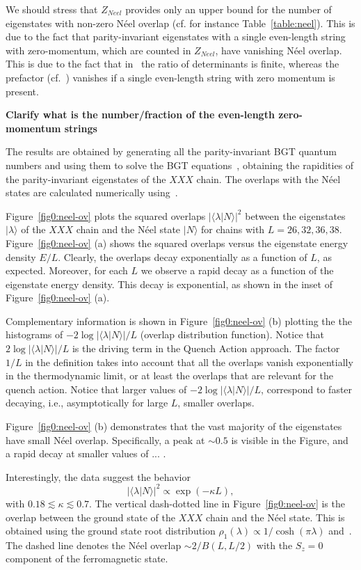 \documentclass[11pt]{iopart}
\begin{document}
We should stress that $Z_{Neel}$ provides only an upper bound for the number of 
eigenstates with non-zero N\'eel overlap (cf. for instance Table~\ref{table:neel}). 
This is due to the fact that parity-invariant eigenstates with a single even-length 
string with zero-momentum, which are counted in $Z_{Neel}$, have vanishing N\'eel 
overlap. This is due to the fact that in~ the ratio of determinants 
is finite, whereas the prefactor (cf.~) vanishes if a single even-length 
string with zero momentum is present. 

{\bf Clarify what is the number/fraction of the even-length zero-momentum strings}

The results are obtained by generating all the parity-invariant BGT quantum numbers 
and using them to solve the BGT equations~, obtaining the rapidities of 
the parity-invariant eigenstates of the $XXX$ chain. The overlaps with the N\'eel 
states are calculated numerically using~. 

Figure~\ref{fig0:neel-ov} plots the squared overlaps $|\langle\lambda|N\rangle|^2$ 
between the eigenstates $|\lambda\rangle$ of the $XXX$ chain and the N\'eel state 
$|N\rangle$ for chains with $L=26,32,36,38$. Figure~\ref{fig0:neel-ov} (a) shows the 
squared overlaps versus the eigenstate energy density $E/L$. Clearly, the overlaps 
decay exponentially as a function of $L$, as expected. Moreover, for each $L$ 
we observe a rapid decay as a function of the eigenstate energy density. 
This decay is exponential, as shown in the inset of Figure~\ref{fig0:neel-ov} (a). 

Complementary information is shown in Figure~\ref{fig0:neel-ov} (b) plotting the 
the histograms of $-2\log|\langle\lambda|N\rangle|/L$ (overlap distribution 
function). Notice that $2\log|\langle\lambda|N\rangle|/L$ is the driving 
term in the Quench Action approach. The factor $1/L$ in the definition takes 
into account that all the overlaps vanish exponentially in the thermodynamic 
limit, or at least the overlaps that are relevant for the quench action. 
Notice that larger values of $-2\log|\langle\lambda|N\rangle|/L$, correspond 
to faster decaying, i.e., asymptotically for large $L$, smaller overlaps. 

Figure~\ref{fig0:neel-ov} (b) demonstrates that the vast majority of the eigenstates 
have small N\'eel overlap. Specifically, a peak at $\sim 0.5$ is visible in the 
Figure, and a rapid decay at smaller values of ... .

Interestingly, the data suggest the behavior
%
\begin{equation}
|\langle\lambda|N\rangle|^2\propto\exp(-\kappa L),
\end{equation}
%
with $0.18\lesssim\kappa\lesssim0.7$. The vertical dash-dotted line in 
Figure~\ref{fig0:neel-ov} is the overlap between the ground state of the 
$XXX$ chain and the N\'eel state. This is obtained using the ground state 
root distribution $\rho_1(\lambda)\propto1/\cosh(\pi\lambda)$  
and~. The dashed line denotes the N\'eel overlap 
$\sim 2/B(L,L/2)$ with the $S_z=0$ component of the ferromagnetic state. 
\end{document}
